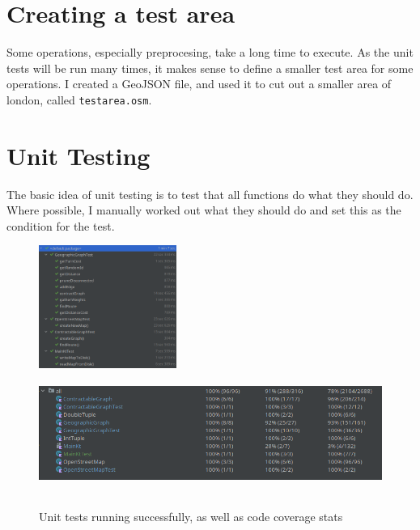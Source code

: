 \documentclass[11pt,twoside,a4paper]{report}
\begin{document}
\section{Creating a test area}
Some operations, especially preprocesing, take a long time to execute. As the unit tests will be run many times, it makes sense to define a smaller test area for some operations. I created a GeoJSON file, and used it to cut out a smaller area of london, called \texttt{testarea.osm}.
\section{Unit Testing}
The basic idea of unit testing is to test that all functions do what they should do. Where possible, I manually worked out what they should do and set this as the condition for the test.
\begin{figure}[t]
    \begin{center}
        \includegraphics[height=4cm]{test.png}
        \includegraphics[height=4cm]{coverage.png}
    \end{center}
    \caption{Unit tests running successfully, as well as code coverage stats}
    \label{testsuccess}
\end{figure}
\end{document}
